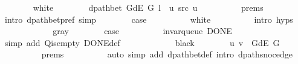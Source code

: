 \begin{isabellebody}
\ \ \ \ \ \ \isamarkupfalse%
\ white\isanewline
\ \ \ \ \ \ \isamarkupfalse%
\ {\isachardoublequoteopen}dpath{\isacharunderscore}{\kern0pt}bet\ {\isacharparenleft}{\kern0pt}G{\isachardot}{\kern0pt}dE\ G{\isacharparenright}{\kern0pt}\ {\isacharparenleft}{\kern0pt}l\ {\isacharat}{\kern0pt}\ {\isacharbrackleft}{\kern0pt}u{\isacharbrackright}{\kern0pt}{\isacharparenright}{\kern0pt}\ src\ u{\isachardoublequoteclose}\isanewline
\ \ \ \ \ \ \ \ \isamarkupfalse%
\ {\isachardoublequoteopen}{}{\isachardot}{\kern0pt}prems{\isachardoublequoteclose}{\isacharparenleft}{\kern0pt}{}{\isacharparenright}{\kern0pt}\isanewline
\ \ \ \ \ \ \ \ \isamarkupfalse%
\ {\isacharparenleft}{\kern0pt}intro\ dpath{\isacharunderscore}{\kern0pt}bet{\isacharunderscore}{\kern0pt}pref{\isacharparenright}{\kern0pt}\ simp\isanewline
\ \ \ \ \ \ \isamarkupfalse%
\ {\isacharquery}{\kern0pt}case\isanewline
\ \ \ \ \ \ \ \ \isamarkupfalse%
\ white\isanewline
\ \ \ \ \ \ \ \ \isamarkupfalse%
\ {\isacharparenleft}{\kern0pt}intro\ {\isachardoublequoteopen}{}{\isachardot}{\kern0pt}hyps{\isachardoublequoteclose}{\isacharparenright}{\kern0pt}\isanewline
\ \ \ \ \isamarkupfalse%
\isanewline
\ \ \ \ \ \ \isamarkupfalse%
\ gray\isanewline
\ \ \ \ \ \ \isamarkupfalse%
\ {\isacharquery}{\kern0pt}case\isanewline
\ \ \ \ \ \ \ \ \isamarkupfalse%
\ invar{\isacharunderscore}{\kern0pt}queue\ DONE\isanewline
\ \ \ \ \ \ \ \ \isamarkupfalse%
\ {\isacharparenleft}{\kern0pt}simp\ add{\isacharcolon}{\kern0pt}\ Q{\isachardot}{\kern0pt}is{\isacharunderscore}{\kern0pt}empty\ DONE{\isacharunderscore}{\kern0pt}def{\isacharparenright}{\kern0pt}\isanewline
\ \ \ \ \isamarkupfalse%
\isanewline
\ \ \ \ \ \ \isamarkupfalse%
\ black\isanewline
\ \ \ \ \ \ \isamarkupfalse%
\ {\isachardoublequoteopen}{\isacharparenleft}{\kern0pt}u{\isacharcomma}{\kern0pt}\ v{\isacharparenright}{\kern0pt}\ {\isasymin}\ G{\isachardot}{\kern0pt}dE\ G{\isachardoublequoteclose}\isanewline
\ \ \ \ \ \ \ \ \isamarkupfalse%
\ {\isachardoublequoteopen}{}{\isachardot}{\kern0pt}prems{\isachardoublequoteclose}{\isacharparenleft}{\kern0pt}{}{\isacharparenright}{\kern0pt}\isanewline
\ \ \ \ \ \ \ \ \isamarkupfalse%
\ {\isacharparenleft}{\kern0pt}auto\ simp\ add{\isacharcolon}{\kern0pt}\ dpath{\isacharunderscore}{\kern0pt}bet{\isacharunderscore}{\kern0pt}def\ intro{\isacharcolon}{\kern0pt}\ dpath{\isacharunderscore}{\kern0pt}snoc{\isacharunderscore}{\kern0pt}edge{\isacharunderscore}{\kern0pt}{}{\isacharparenright}{\kern0pt}\isanewline

\end{isabellebody}
